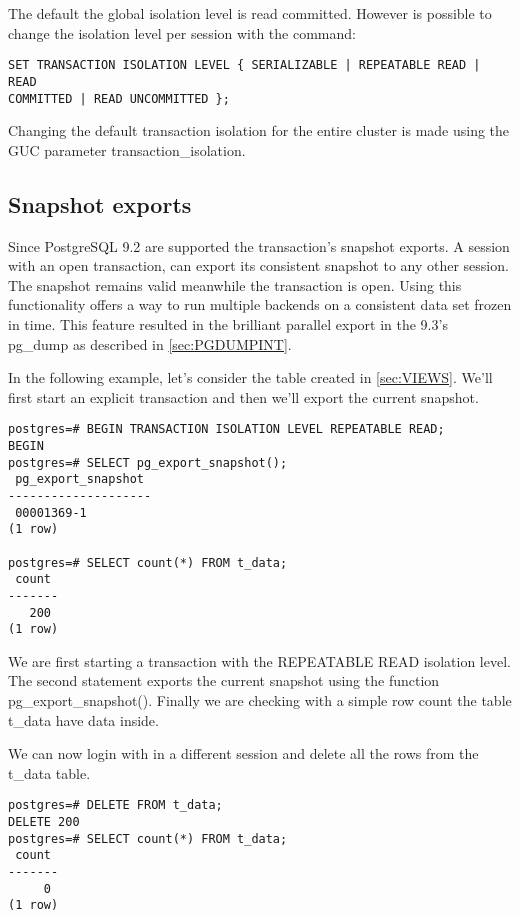 The default the global isolation level is read committed. However is possible to change the
isolation level per session with the command:
\begin{lstlisting}[style=pgsql]
SET TRANSACTION ISOLATION LEVEL { SERIALIZABLE | REPEATABLE READ | READ 
COMMITTED | READ UNCOMMITTED }; 
\end{lstlisting}

Changing the default transaction isolation for the entire cluster is made using the GUC parameter
transaction\_isolation.


\subsection{Snapshot exports}
\label{sub:SNAPEXPORT}
Since PostgreSQL 9.2 are supported the transaction's snapshot exports. A session with an open 
transaction, can export its consistent snapshot to any other session. The snapshot remains valid 
meanwhile the transaction is open. Using this functionality offers a way to run multiple backends 
on a consistent data set frozen in time. This feature resulted in the brilliant parallel export in 
the 9.3's pg\_dump as described in \ref{sec:PGDUMPINT}.\newline

In the following example, let's consider the table created in \ref{sec:VIEWS}. We'll first start an 
explicit transaction and then we'll export the current snapshot.

\begin{lstlisting}[style=pgsql]
postgres=# BEGIN TRANSACTION ISOLATION LEVEL REPEATABLE READ;
BEGIN
postgres=# SELECT pg_export_snapshot();
 pg_export_snapshot 
--------------------
 00001369-1
(1 row)

postgres=# SELECT count(*) FROM t_data;
 count 
-------
   200
(1 row)

\end{lstlisting}

We are first starting a transaction with the REPEATABLE READ isolation level. The second 
statement exports the current snapshot using the function pg\_export\_snapshot(). Finally we are 
checking with a simple row count the table t\_data have data inside.\newline

We can now login with in a different session and delete all the rows from the t\_data table.

\begin{lstlisting}[style=pgsql]
postgres=# DELETE FROM t_data;
DELETE 200
postgres=# SELECT count(*) FROM t_data;
 count 
-------
     0
(1 row)

\end{lstlisting}

